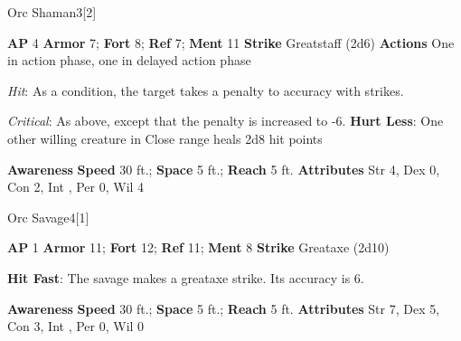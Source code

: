 \begin{monsection}{Orc Shaman}{3}[2]
\vspace{-1em}\vspace{-1em}
\begin{spellcontent}
\begin{spelltargetinginfo}
{\textbf{AP} 4}
\pari \textbf{Armor} 7;
\textbf{Fort} 8;
\textbf{Ref} 7;
\textbf{Ment} 11
\pari \textbf{Strike} Greatstaff  (2d6)
\pari \textbf{Actions} One in action phase, one in delayed action phase
\end{spelltargetinginfo}
\begin{spelleffects}
\pari
{}
\par
\par \textit{Hit}: As a condition, the target takes a  penalty to accuracy with strikes.
\par \textit{Critical}: As above, except that the penalty is increased to -6.
\vspace{0.5em}
\pari
\textbf{Hurt Less}:
One other willing creature in Close range heals 2d8 hit points
\end{spelleffects}
\end{spellcontent}
\begin{spellsubcontent}
\begin{spellfooter}
\pari \textbf{Awareness} 
\pari \textbf{Speed} 30 ft.;
\textbf{Space} 5 ft.;
\textbf{Reach} 5 ft.
\pari \textbf{Attributes}
Str 4,
Dex 0,
Con 2,
Int ,
Per 0,
Wil 4
\end{spellfooter}
\end{spellsubcontent}
\end{monsection}
\begin{monsection}{Orc Savage}{4}[1]
\vspace{-1em}\vspace{-1em}
\begin{spellcontent}
\begin{spelltargetinginfo}
{\textbf{AP} 1}
\pari \textbf{Armor} 11;
\textbf{Fort} 12;
\textbf{Ref} 11;
\textbf{Ment} 8
\pari \textbf{Strike} Greataxe  (2d10)
\end{spelltargetinginfo}
\begin{spelleffects}
\pari
\textbf{Hit Fast}:
The savage makes a greataxe strike.
Its accuracy is 6.
\end{spelleffects}
\end{spellcontent}
\begin{spellsubcontent}
\begin{spellfooter}
\pari \textbf{Awareness} 
\pari \textbf{Speed} 30 ft.;
\textbf{Space} 5 ft.;
\textbf{Reach} 5 ft.
\pari \textbf{Attributes}
Str 7,
Dex 5,
Con 3,
Int ,
Per 0,
Wil 0
\end{spellfooter}
\end{spellsubcontent}
\end{monsection}
